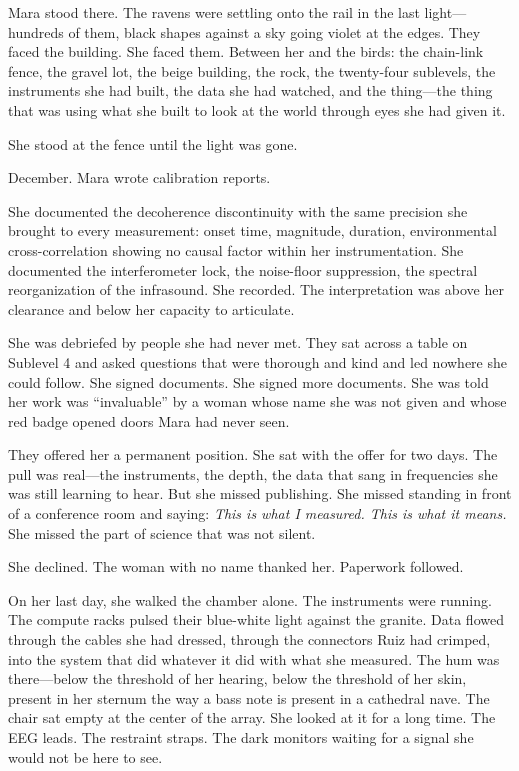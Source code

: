 Mara stood there. The ravens were settling onto the rail in the last light---hundreds of them, black shapes against a sky going violet at the edges. They faced the building. She faced them. Between her and the birds: the chain-link fence, the gravel lot, the beige building, the rock, the twenty-four sublevels, the instruments she had built, the data she had watched, and the thing---the thing that was using what she built to look at the world through eyes she had given it.

She stood at the fence until the light was gone.

\scenebreak

December. Mara wrote calibration reports.

She documented the decoherence discontinuity with the same precision she brought to every measurement: onset time, magnitude, duration, environmental cross-correlation showing no causal factor within her instrumentation. She documented the interferometer lock, the noise-floor suppression, the spectral reorganization of the infrasound. She recorded. The interpretation was above her clearance and below her capacity to articulate.

She was debriefed by people she had never met. They sat across a table on Sublevel 4 and asked questions that were thorough and kind and led nowhere she could follow. She signed documents. She signed more documents. She was told her work was ``invaluable'' by a woman whose name she was not given and whose red badge opened doors Mara had never seen.

They offered her a permanent position. She sat with the offer for two days. The pull was real---the instruments, the depth, the data that sang in frequencies she was still learning to hear. But she missed publishing. She missed standing in front of a conference room and saying: \textit{This is what I measured. This is what it means.} She missed the part of science that was not silent.

She declined. The woman with no name thanked her. Paperwork followed.

On her last day, she walked the chamber alone. The instruments were running. The compute racks pulsed their blue-white light against the granite. Data flowed through the cables she had dressed, through the connectors Ruiz had crimped, into the system that did whatever it did with what she measured. The hum was there---below the threshold of her hearing, below the threshold of her skin, present in her sternum the way a bass note is present in a cathedral nave. The chair sat empty at the center of the array. She looked at it for a long time. The EEG leads. The restraint straps. The dark monitors waiting for a signal she would not be here to see.

